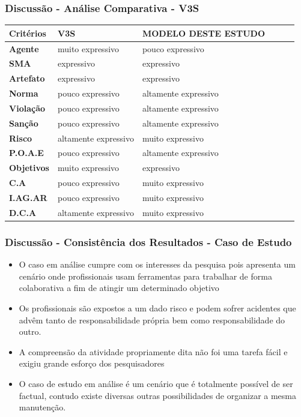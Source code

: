 \documentclass{beamer}
\begin{document}
\begin{frame}
	\frametitle{Discussão - Análise Comparativa - V3S}
	\begin{table}[H]
	    \begin{tabular}{|l|l|l|l|l|l|}
        \textbf{Critérios} 	&	 \textbf{V3S}         	&	 \textbf{MODELO DESTE ESTUDO} \\ \hline
        \textbf{Agente}    	&	 muito expressivo     	&	 pouco expressivo             \\ \hline
        \textbf{SMA}       	&	 expressivo           	&	 expressivo                   \\ \hline
        \textbf{Artefato}  	&	 expressivo           	&	 expressivo                   \\ \hline
        \textbf{Norma}     	&	 pouco expressivo     	&	 altamente expressivo         \\ \hline
        \textbf{Violação}  	&	 pouco expressivo     	&	 altamente expressivo         \\ \hline
        \textbf{Sanção}    	&	 pouco expressivo     	&	 altamente expressivo         \\ \hline
        \textbf{Risco}     	&	 altamente expressivo 	&	 muito expressivo             \\ \hline
        \textbf{P.O.A.E}   	&	 pouco expressivo     	&	 altamente expressivo         \\ \hline
        \textbf{Objetivos} 	&	 muito expressivo       &	 expressivo             	  \\ \hline
        \textbf{C.A}       	&	 pouco expressivo     	&	 muito expressivo             \\ \hline
        \textbf{I.AG.AR}   	&	 pouco expressivo     	&	 muito expressivo             \\ \hline
        \textbf{D.C.A}     	&	 altamente expressivo 	&	 muito expressivo             \\ \hline
	    \end{tabular}
	\end{table}	
\end{frame}

\begin{frame}
	\frametitle{Discussão - Consistência dos Resultados - Caso de Estudo}
	\begin{itemize}
		\item  O caso em análise cumpre com os interesses da pesquisa pois apresenta um cenário onde profissionais usam ferramentas para trabalhar de forma colaborativa a fim de atingir um determinado objetivo
		\item Os profissionais são expostos a um dado risco e podem sofrer acidentes que advêm tanto de responsabilidade própria bem como responsabilidade do outro.
		\item A compreensão da atividade propriamente dita não foi uma tarefa fácil e exigiu grande esforço dos pesquisadores
		\item O caso de estudo em análise é um cenário que é totalmente possível de ser factual, contudo existe diversas outras possibilidades de organizar a mesma manutenção.
	\end{itemize}
\end{frame}
\end{document}
